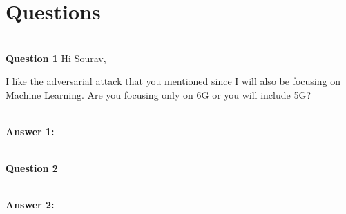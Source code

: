 \documentclass[journal]{IEEEtran}
\begin{document}
\section{Questions}
\\
\textbf{Question 1}
Hi Sourav,

I like the adversarial attack that you mentioned since I will also be focusing on Machine Learning. Are you focusing only on 6G or you will include 5G?


\\
\textbf{Answer 1:}


\\
\textbf{Question 2}


\\
\textbf{Answer 2:}
\end{document}
